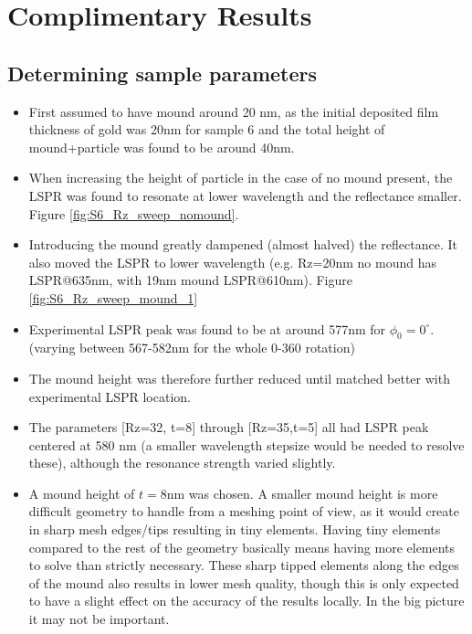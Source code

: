 \appendix

\chapter{Complimentary Results}
\label{sec:AppendixA}

\section{Determining sample parameters}
\label{appendix:sample_parameters}
\begin{itemize}
    \item First assumed to have mound around 20 nm, as the initial deposited film thickness of gold was 20nm for sample 6 and the total height of mound+particle was found to be around 40nm.
    \item When increasing the height of particle in the case of no mound present, the LSPR was found to resonate at lower wavelength and the reflectance smaller. Figure \ref{fig:S6_Rz_sweep_nomound}.
    \item Introducing the mound greatly dampened (almost halved) the reflectance. It also moved the LSPR to lower wavelength (e.g. Rz=20nm no mound has LSPR@635nm, with 19nm mound LSPR@610nm). Figure \ref{fig:S6_Rz_sweep_mound_1}
    \item Experimental LSPR peak was found to be at around 577nm for $\phi_0=0^\circ$. (varying between 567-582nm for the whole 0-360 rotation)
    \item The mound height was therefore further reduced until matched better with experimental LSPR location.
    \item The parameters [Rz=32, t=8] through [Rz=35,t=5] all had LSPR peak centered at 580 nm (a smaller wavelength stepsize would be needed to resolve these), although the resonance strength varied slightly.
    \item A mound height of $t=8$nm was chosen. A smaller mound height is more difficult geometry to handle from a meshing point of view, as it would create in sharp mesh edges/tips resulting in tiny elements. Having tiny elements compared to the rest of the geometry basically means having more elements to solve than strictly necessary. These sharp tipped elements along the edges of the mound also results in lower mesh quality, though this is only expected to have a slight effect on the accuracy of the results locally. In the big picture it may not be important.
\end{itemize}

